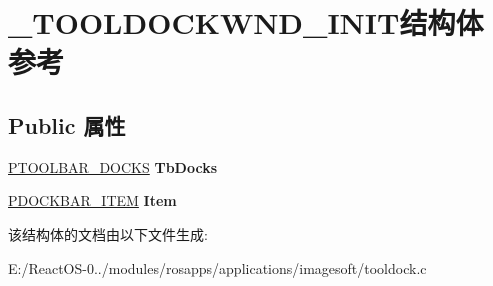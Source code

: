 \hypertarget{struct___t_o_o_l_d_o_c_k_w_n_d___i_n_i_t}{}\section{\+\_\+\+T\+O\+O\+L\+D\+O\+C\+K\+W\+N\+D\+\_\+\+I\+N\+I\+T结构体 参考}
\label{struct___t_o_o_l_d_o_c_k_w_n_d___i_n_i_t}
\subsection*{Public 属性}
\begin{DoxyCompactItemize}
\item 
\mbox{\label{struct___t_o_o_l_d_o_c_k_w_n_d___i_n_i_t_a6c8d2c594ca5dbabba443713462dfd13}} 
\hyperlink{struct___t_o_o_l_b_a_r___d_o_c_k_s}{P\+T\+O\+O\+L\+B\+A\+R\+\_\+\+D\+O\+C\+KS} {\bfseries Tb\+Docks}
\item 
\mbox{\label{struct___t_o_o_l_d_o_c_k_w_n_d___i_n_i_t_aabd5510b2903aa6a844bb6bbe08e4943}} 
\hyperlink{struct___d_o_c_k_b_a_r___i_t_e_m}{P\+D\+O\+C\+K\+B\+A\+R\+\_\+\+I\+T\+EM} {\bfseries Item}
\end{DoxyCompactItemize}


该结构体的文档由以下文件生成\+:\begin{DoxyCompactItemize}
\item 
E\+:/\+React\+O\+S-\/0../modules/rosapps/applications/imagesoft/tooldock.\+c\end{DoxyCompactItemize}
